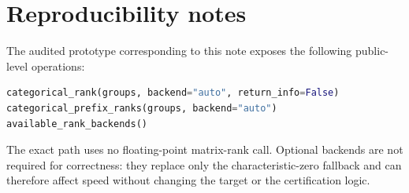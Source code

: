 \documentclass[11pt]{article}
\theoremstyle{definition}
\newcommand{\1}{\mathbf{1}}
\begin{document}
\section{Reproducibility notes}

The audited prototype corresponding to this note exposes the following public-level operations:
\begin{lstlisting}[language=Python]
categorical_rank(groups, backend="auto", return_info=False)
categorical_prefix_ranks(groups, backend="auto")
available_rank_backends()
\end{lstlisting}
The exact path uses no floating-point matrix-rank call. Optional backends are not required for correctness: they replace only the characteristic-zero fallback and can therefore affect speed without changing the target or the certification logic.
\end{document}
